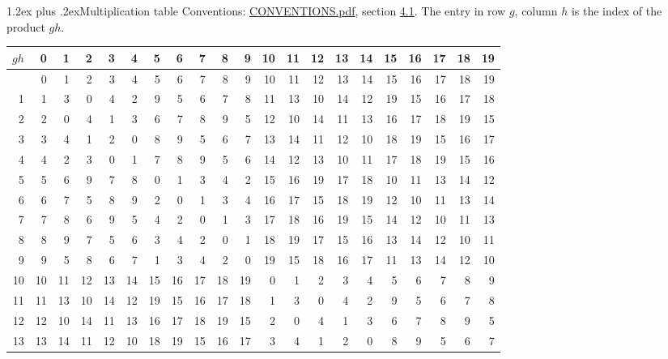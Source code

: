 \documentclass[10pt,a4paper]{article}
\makeatletter
\renewcommand\section{\@startsection{section}{1}{\z@}{-3ex plus -1ex minus -.2ex}%
  {1.2ex plus .2ex}{\normalfont\large\sffamily\bfseries\color{parttitle}}}
\numberwithin{equation}{section}
\makeatother
\begin{document}
\section{Multiplication table}\label{s:multiplication}
Conventions: \href{../../CONVENTIONS.pdf}{CONVENTIONS.pdf}, section \href{../../CONVENTIONS.pdf\#conv.4.1}{4.1}.
The entry in row $g$, column $h$ is the index of the product $gh$.
{\normalsize\setlength{\tabcolsep}{0.1em}\setlength{\LTleft}{-8pt plus 1fill}\setlength{\LTright}{-8pt plus 1fill}\begin{longtable}{@{}r|rrrrrrrrrrrrrrrrrrrr@{}}\toprule
$gh$ & 0 & 1 & 2 & 3 & 4 & 5 & 6 & 7 & 8 & 9 & 10 & 11 & 12 & 13 & 14 & 15 & 16 & 17 & 18 & 19\\\midrule\endhead
\bottomrule\endfoot\endlastfoot
0 & 0 & 1 & 2 & 3 & 4 & 5 & 6 & 7 & 8 & 9 & 10 & 11 & 12 & 13 & 14 & 15 & 16 & 17 & 18 & 19\\*
1 & 1 & 3 & 0 & 4 & 2 & 9 & 5 & 6 & 7 & 8 & 11 & 13 & 10 & 14 & 12 & 19 & 15 & 16 & 17 & 18\\
2 & 2 & 0 & 4 & 1 & 3 & 6 & 7 & 8 & 9 & 5 & 12 & 10 & 14 & 11 & 13 & 16 & 17 & 18 & 19 & 15\\
3 & 3 & 4 & 1 & 2 & 0 & 8 & 9 & 5 & 6 & 7 & 13 & 14 & 11 & 12 & 10 & 18 & 19 & 15 & 16 & 17\\
4 & 4 & 2 & 3 & 0 & 1 & 7 & 8 & 9 & 5 & 6 & 14 & 12 & 13 & 10 & 11 & 17 & 18 & 19 & 15 & 16\\
5 & 5 & 6 & 9 & 7 & 8 & 0 & 1 & 3 & 4 & 2 & 15 & 16 & 19 & 17 & 18 & 10 & 11 & 13 & 14 & 12\\
6 & 6 & 7 & 5 & 8 & 9 & 2 & 0 & 1 & 3 & 4 & 16 & 17 & 15 & 18 & 19 & 12 & 10 & 11 & 13 & 14\\
7 & 7 & 8 & 6 & 9 & 5 & 4 & 2 & 0 & 1 & 3 & 17 & 18 & 16 & 19 & 15 & 14 & 12 & 10 & 11 & 13\\
8 & 8 & 9 & 7 & 5 & 6 & 3 & 4 & 2 & 0 & 1 & 18 & 19 & 17 & 15 & 16 & 13 & 14 & 12 & 10 & 11\\
9 & 9 & 5 & 8 & 6 & 7 & 1 & 3 & 4 & 2 & 0 & 19 & 15 & 18 & 16 & 17 & 11 & 13 & 14 & 12 & 10\\
10 & 10 & 11 & 12 & 13 & 14 & 15 & 16 & 17 & 18 & 19 & 0 & 1 & 2 & 3 & 4 & 5 & 6 & 7 & 8 & 9\\
11 & 11 & 13 & 10 & 14 & 12 & 19 & 15 & 16 & 17 & 18 & 1 & 3 & 0 & 4 & 2 & 9 & 5 & 6 & 7 & 8\\
12 & 12 & 10 & 14 & 11 & 13 & 16 & 17 & 18 & 19 & 15 & 2 & 0 & 4 & 1 & 3 & 6 & 7 & 8 & 9 & 5\\
13 & 13 & 14 & 11 & 12 & 10 & 18 & 19 & 15 & 16 & 17 & 3 & 4 & 1 & 2 & 0 & 8 & 9 & 5 & 6 & 7\\

\end{longtable}}
\end{document}
